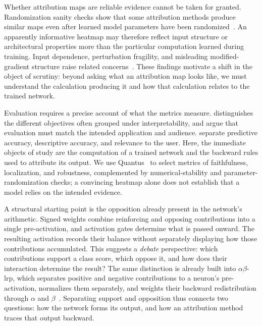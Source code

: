 Whether attribution maps are reliable evidence cannot be taken for granted. Randomization sanity checks show that some attribution methods produce similar maps even after learned model parameters have been randomized~\parencite{Adebayo2018sanity}. An apparently informative heatmap may therefore reflect input structure or architectural properties more than the particular computation learned during training. Input dependence, perturbation fragility, and misleading modified-gradient structure raise related concerns~\parencite{Kindermans2019Unreliability,Ghorbani2019fragile,Nie2018guided,sixt2020whenexplanationslie}. These findings motivate a shift in the object of scrutiny: beyond asking what an attribution map looks like, we must understand the calculation producing it and how that calculation relates to the trained network.

Evaluation requires a precise account of what the metrics measure. \textcite{Lipton2018Mythos} distinguishes the different objectives often grouped under interpretability, and \textcite{DoshiVelezKim2017} argue that evaluation must match the intended application and audience. \textcite{Murdoch2019Interpretability} separate predictive accuracy, descriptive accuracy, and relevance to the user. Here, the immediate objects of study are the computation of a trained network and the backward rules used to attribute its output. We use Quantus~\parencite{Hedstrom2023} to select metrics of faithfulness, localization, and robustness, complemented by numerical-stability and parameter-randomization checks; a convincing heatmap alone does not establish that a model relies on the intended evidence.

A structural starting point is the opposition already present in the network's arithmetic. Signed weights combine reinforcing and opposing contributions into a single pre-activation, and activation gates determine what is passed onward. The resulting activation records their balance without separately displaying how those contributions accumulated. This suggests a \emph{debate} perspective: which contributions support a class score, which oppose it, and how does their interaction determine the result? The same distinction is already built into $\alpha\beta$-\ac{lrp}, which separates positive and negative contributions to a neuron's pre-activation, normalizes them separately, and weights their backward redistribution through $\alpha$ and $\beta$~\parencite{Bach2015}. Separating support and opposition thus connects two questions: how the network forms its output, and how an attribution method traces that output backward.

